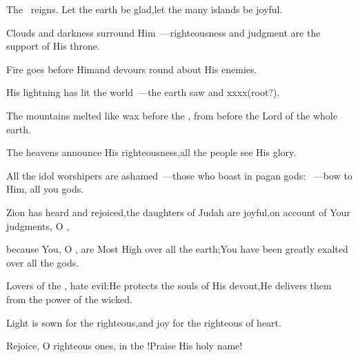 
\begin{inparaenum}
  \pa{} The \lord\ reigns. Let the earth be glad,\pa{}let the many islands%
  be joyful.%

  \pa{} Clouds and darkness surround Him~---\pa{}righteousness and judgment are the support of His throne.%

  \pa{} Fire goes before Him\pa{}and devours round about His%
  enemies.%

  \pa{} His lightning has lit the world~---\pa{}the earth saw and xxxx(root?).%

  \pa{} The mountains melted like wax%
  before the \lord,%
  \pa{}from before%
  the Lord of the whole earth.%

  \pa{} The heavens announce His righteousness,\pa{}all the people see His glory.%

  \pa{} All the idol worshipers are ashamed~---\pa{}those who boast in pagan gods:%
  ~---\pa{}bow%
  to Him, all you gods.%

  \pa{} Zion has heard and rejoiced,\pa{}the daughters of Judah are joyful,\pa{}on account of Your judgments, O \lord,%

  \pa{} because You, O \lord,%
  are Most High over all the earth;\pa{}You have been greatly exalted over all the gods.%

  \pa{} Lovers of the \lord, hate evil:\pa{}He protects the souls of His devout,\pa{}He delivers them from the power of the wicked.%

  \pa{} Light is sown%
  for the righteous,\pa{}and joy for the righteous of heart.%

  \pa{} Rejoice, O righteous ones, in the \lord!\pa{}Praise His holy name!%
\end{inparaenum}

